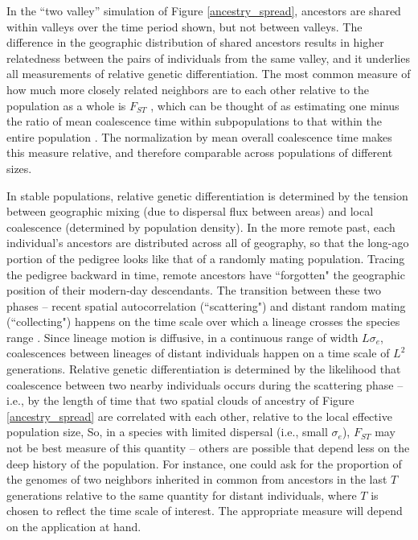 \documentclass{ar-1col}
\begin{document}
{In the ``two valley'' simulation of Figure \ref{ancestry_spread},
ancestors are shared within valleys over the time period shown,
but not between valleys.
The difference in the geographic distribution of shared ancestors 
results in higher relatedness between the pairs of individuals 
from the same valley, 
and it underlies all measurements of relative genetic differentiation.
The most common measure of
how much more closely related neighbors are to each other relative to the population as a whole
is $F_{ST}$ \citep{Wright1951},
which can be thought of as estimating
one minus the ratio of mean coalescence time within subpopulations
to that within the entire population \citep{slatkin_1991inbreeding}.
The normalization by mean overall coalescence time 
makes this measure relative, 
and therefore comparable across populations of different sizes.

In stable populations,
relative genetic differentiation is determined by the tension between 
geographic mixing (due to dispersal flux between areas)
and local coalescence (determined by population density).
In the more remote past, each individual's ancestors are distributed across
all of geography,
so that the long-ago portion of the pedigree looks like that of a randomly mating population.
Tracing the pedigree backward in time, 
remote ancestors have ``forgotten" the geographic position of their 
modern-day descendants.
The transition between these two phases -- recent spatial autocorrelation 
(``scattering") and distant random mating (``collecting")
\citep{Wakeley1999,wilkins2004separationoftimescales}
happens on the time scale over which a lineage crosses the species range \citep{Wakeley1999}.
Since lineage motion is diffusive, in a continuous range of width $L \sigma_e$,
coalescences between lineages of distant individuals happen on a time scale of $L^2$ generations.
Relative genetic differentiation
is determined by the likelihood that coalescence between two nearby individuals
occurs during the scattering phase
-- i.e., by the length of time that two spatial clouds of ancestry of Figure \ref{ancestry_spread}
are correlated with each other,
relative to the local effective population size,
So, in a species with limited dispersal (i.e., small $\sigma_e$),
$F_{ST}$ may not be best measure of this quantity -- 
others are possible that depend less on the deep history of the population.
For instance,
one could ask for the proportion of the genomes of two neighbors 
inherited in common from ancestors in the last $T$ generations
relative to the same quantity for distant individuals,
where $T$ is chosen to reflect the time scale of interest.
The appropriate measure will depend on the application at hand.

}
\end{document}
